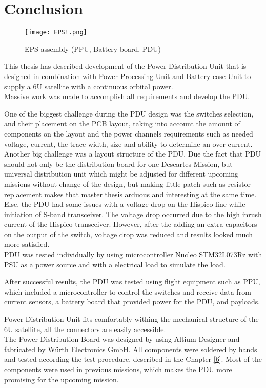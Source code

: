 \chapter{Conclusion\label{cha:chapter7}}

 \begin{figure}[h]
 	\centering
 	\texttt{[image: EPS!.png]}
 	\caption{EPS assembly (PPU, Battery board, PDU)}
 	\label{fig: EPS!}
 \end{figure}

This thesis has described development of the Power Distribution Unit that is designed in combination with Power Processing Unit and Battery case Unit to supply a 6U satellite with a continuous orbital power.\\  


Massive work was made to accomplish all requirements and develop the PDU.

 One of the biggest challenge during the PDU design was the switches selection, and their placement on the PCB layout, taking into account the amount of components on the layout and the power channels requirements such as needed voltage, current, the trace width, size and ability to determine an over-current. Another big challenge was a layout structure of the PDU. Due the fact that PDU should not only be the distribution board for one Descartes Mission, but universal distribution unit which might be adjusted for different upcoming missions without change of the design, but making little patch such as resistor replacement makes that master thesis arduous and interesting at the same time. Else, the PDU had some issues with a voltage drop on the Hispico line while initiation of S-band transceiver. The voltage drop occurred due to the high inrush current of the Hispico transceiver.    However, after the adding an extra capacitors on the output of the switch, voltage drop was reduced and results looked much more satisfied.    \\

PDU was tested individually by using microcontroller Nucleo STM32L073Rz with PSU as a power source and with a electrical load to simulate the load. 

After successful results, the PDU was tested using flight equipment such as PPU, which included a microcontroller to control the switches and receive data from current sensors, a battery board that provided power for the PDU, and payloads. 

Power Distribution Unit fits comfortably withing the mechanical structure of the 6U satellite, all the connectors are easily accessible. 
\\
The Power Distribution Board was designed by using Altium Designer and fabricated by Würth Electronics GmbH. All components were soldered by hands and tested according the test procedure, described in the Chapter \ref{6}. Most of the components were used in previous missions, which makes the PDU more promising for the upcoming mission.  \\

